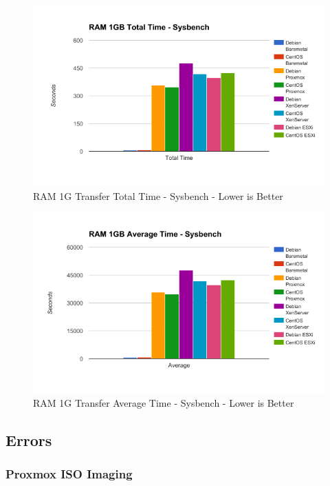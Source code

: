 \documentclass[12pt]{spieman}  %
\begin{document}
\begin{figure}[H]
\caption{RAM 1G Transfer Total Time - Sysbench - Lower is Better}
\centering
\includegraphics[width=\textwidth,keepaspectratio]{Graphs/RAM-1G-Total}
\end{figure}

\begin{figure}[H]
\caption{RAM 1G Transfer Average Time - Sysbench - Lower is Better}
\centering
\includegraphics[width=\textwidth,keepaspectratio]{Graphs/RAM-1G-Average}
\end{figure}

\subsection{Errors}

\subsubsection{Proxmox ISO Imaging}
\end{document}
